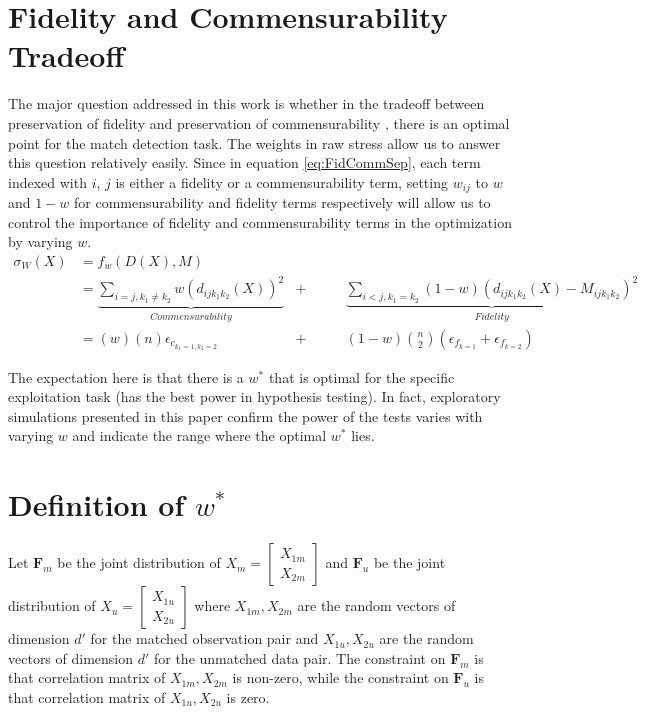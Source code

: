 \documentclass[11pt]{article} %
\begin{document}
\section{Fidelity and Commensurability Tradeoff}
The major question  addressed in this work is whether in the tradeoff between preservation of fidelity and preservation of  commensurability , there is an optimal point for the match detection task.  The weights in raw stress allow us to answer this question relatively easily. Since in equation \eqref{eq:FidCommSep},  each term indexed with $i$, $j$ is either a fidelity or a commensurability term, setting $w_{ij}$ to $w$ and $1-w$  for commensurability  and fidelity  terms respectively will allow us to control the importance of fidelity and commensurability terms in the optimization by varying $w$. 
\begin{align*}
\sigma_W(X)&=  f_w(D(X),M) & &\\
&=  \underbrace{\sum_{i=j,k_1\neq k_2}  {w(d_{ij{k_1}{k_2}}(X))^2}}_{Commensurability} & +\hspace{2em} & \underbrace{\sum_{i<j,k_1=k_2}  {(1-w)(d_{ij{k_1}{k_2}}(X)-M_{ijk_1k_2})^2  }  } _{Fidelity}\\
&=  \left(w\right)\left(n\right) \epsilon_{c_{k_1=1,k_2=2}} & +\hspace{2em} & (1-w){{n}\choose{2}} ( \epsilon_{f_{k=1}}+\epsilon_{f_{k=2}} )
\end{align*}

The expectation here is that there is a $w^*$ that is optimal for the specific exploitation task (has the best power in hypothesis testing). In fact,  exploratory simulations presented in this paper confirm the power of the tests varies with varying $w$ and indicate the range where the optimal  $w^*$ lies.



\section{Definition of  $w^*$}

Let $\mathbf{F}_m$ be the joint distribution of
$X_m= \left[
 \begin{array}{c}
X_{1m}\\
X_{2m}
\end{array}
\right]$ and 
$\mathbf{F}_u$ be the  joint distribution of
$X_u= \left[
 \begin{array}{c}
 X_{1u}\\
 X_{2u} 
\end{array}
\right]$
 where   $X_{1m},X_{2m}$ are the random vectors of dimension $d'$ for the matched observation pair and $X_{1u},X_{2u}$ are the random vectors of dimension $d'$ for the unmatched data pair.   The constraint on  $\mathbf{F}_m$ is that  correlation  matrix of $X_{1m},X_{2m}$ is non-zero, while  the constraint on $\mathbf{F}_u$   is that correlation  matrix of $X_{1u},X_{2u}$ is zero.
\end{document}
